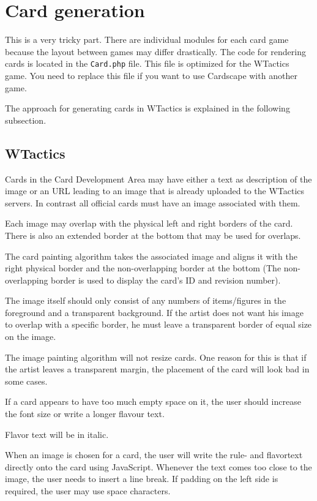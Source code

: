 \documentclass[a4paper, 11pt]{scrbook}
\begin{document}
\section{Card generation}
This is a very tricky part. There are individual modules for each card game because the layout between games may differ drastically. The code for rendering cards is located in the \texttt{Card.php} file. This file is optimized for the WTactics game. You need to replace this file if you want to use Cardscape with another game.

The approach for generating cards in WTactics is explained in the following subsection.

\subsection{WTactics}
Cards in the Card Development Area may have either a text as description of the image or an URL leading to an image that is already uploaded to the WTactics servers. In contrast all official cards must have an image associated with them.

Each image may overlap with the physical left and right borders of the card. There is also an extended border at the bottom that may be used for overlaps.

The card painting algorithm takes the associated image and aligns it with the right physical border and  the non-overlapping border at the bottom (The non-overlapping border is used to display the card's ID and revision number).

The image itself should only consist of any numbers of items/figures in the foreground and a transparent background. If the artist does not want his image to overlap with a specific border, he must leave a transparent border of equal size on the image.

The image painting algorithm will not resize cards. One reason for this is that if the artist leaves a transparent margin, the placement of the card will look bad in some cases.

If a card appears to have too much empty space on it, the user should increase the font size or write a longer flavour text.

Flavor text will be in italic.

When an image is chosen for a card, the user will write the rule- and flavortext directly onto the card using JavaScript. Whenever the text comes too close to the image, the user needs to insert a line break. If padding on the left side is required, the user may use space characters.
\end{document}
